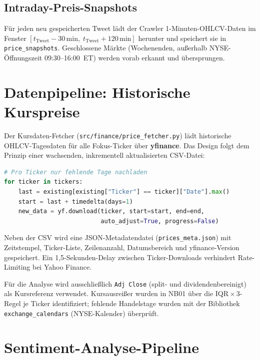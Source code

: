 \documentclass[11pt, a4paper]{article}
\begin{document}
\subsection{Intraday-Preis-Snapshots}

Für jeden neu gespeicherten Tweet lädt der Crawler 1-Minuten-OHLCV-Daten
im Fenster $[t_{\text{Tweet}} - 30\,\text{min},\; t_{\text{Tweet}} + 120\,\text{min}]$
herunter und speichert sie in \texttt{price\_snapshots}. Geschlossene Märkte
(Wochenenden, außerhalb NYSE-Öffnungszeit 09:30--16:00~ET) werden vorab
erkannt und übersprungen.

\section{Datenpipeline: Historische Kurspreise}
\label{sec:preise}

Der Kursdaten-Fetcher (\texttt{src/finance/price\_fetcher.py}) lädt historische
OHLCV-Tagesdaten für alle Fokus-Ticker über \textbf{yfinance}. Das Design folgt
dem Prinzip einer wachsenden, inkrementell aktualisierten CSV-Datei:

\begin{lstlisting}[language=Python, caption={Inkrementelles Laden (price\_fetcher.py)}]
# Pro Ticker nur fehlende Tage nachladen
for ticker in tickers:
    last = existing[existing["Ticker"] == ticker]["Date"].max()
    start = last + timedelta(days=1)
    new_data = yf.download(ticker, start=start, end=end,
                           auto_adjust=True, progress=False)
\end{lstlisting}

Neben der CSV wird eine JSON-Metadatendatei (\texttt{prices\_meta.json}) mit
Zeitstempel, Ticker-Liste, Zeilenanzahl, Datumsbereich und yfinance-Version
gespeichert. Ein 1{,}5-Sekunden-Delay zwischen Ticker-Downloads verhindert
Rate-Limiting bei Yahoo Finance.

Für die Analyse wird ausschließlich \texttt{Adj~Close} (split- und
dividendenbereinigt) als Kursreferenz verwendet. Kursausreißer wurden in NB01
über die IQR\,$\times$\,3-Regel je Ticker identifiziert; fehlende Handelstage
wurden mit der Bibliothek \texttt{exchange\_calendars} (NYSE-Kalender) überprüft.

\section{Sentiment-Analyse-Pipeline}
\label{sec:sentiment}
\end{document}
